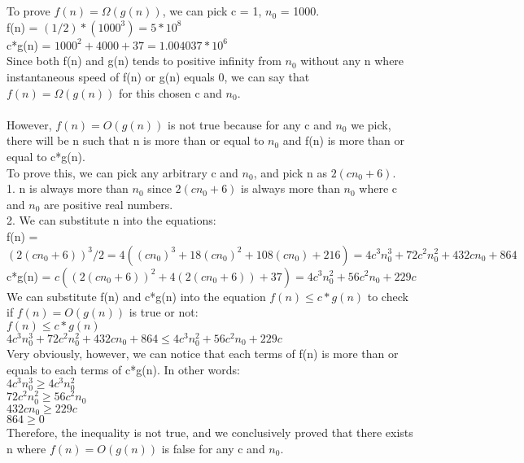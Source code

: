 \begin{enumerate}
                
                \\
                \\To prove $f(n) = \Omega(g(n))$, we can pick c = 1, $n_0$ = 1000.
                \\ f(n) = $(1/2)*(1000^3) = 5*10^8$
                \\c*g(n) = $1000^2+4000+37 = 1.004037*10^6$
                \\Since both f(n) and g(n) tends to positive infinity from $n_0$ without any n where instantaneous speed of f(n) or g(n) equals 0, we can say that $f(n) = \Omega(g(n))$ for this chosen c and $n_0$.
                \\
                \\However, $f(n) = O(g(n))$ is not true because for any c and $n_0$ we pick, there will be n such that n is more than or equal to $n_0$ and f(n) is more than or equal to c*g(n). 
                \\To prove this, we can pick any arbitrary c and $n_0$, and pick n as $2(cn_0+6)$.
                \\1. n is always more than $n_0$ since $2(cn_0+6)$ is always more than $n_0$ where c and $n_0$ are positive real numbers.
                \\2. We can substitute n into the equations:
                \\f(n) = $(2(cn_0+6))^3/2 = 4((cn_0)^3+18(cn_0)^2+108(cn_0)+216) = 4c^3n_{0}^3+72c^2n_{0}^2+432cn_0+864$
                \\c*g(n) = $c((2(cn_0+6))^2+4(2(cn_0+6))+37) = 4c^3n_{0}^2+56c^2n_0+229c$
                \\ We can substitute f(n) and c*g(n) into the equation $f(n) \leq c*g(n)$ to check if $f(n) = O(g(n))$ is true or not:
                \\$f(n) \leq c*g(n)$
                \\$4c^3n_{0}^3+72c^2n_{0}^2+432cn_0+864 \leq 4c^3n_{0}^2+56c^2n_0+229c$
                \\Very obviously, however, we can notice that each terms of f(n) is more than or equals to each terms of c*g(n). In other words:
                \\$4c^3n_{0}^3 \geq 4c^3n_{0}^2$
                \\$72c^2n_{0}^2 \geq 56c^2n_0$
                \\$432cn_0 \geq 229c$
                \\$864 \geq 0$
                \\Therefore, the inequality is not true, and we conclusively proved that there exists n where $f(n) = O(g(n))$ is false for any c and $n_0$.
                
\\\boxed{}
                
\vfill                
          \end{enumerate}
\newpage
